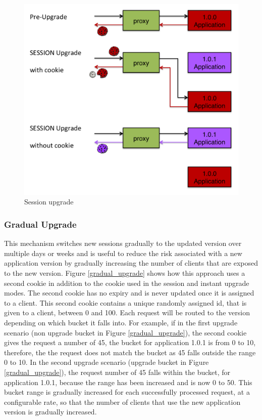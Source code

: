 \documentclass[a4paper,11pt,twoside]{report}
\begin{document}
   
\begin{figure}[!ht]
  \centering
     \includegraphics[scale=0.30]{session_upgrade}
  \caption{Session upgrade}
  \label{session_upgrade}
\end{figure}

\clearpage
\subsubsection*{Gradual Upgrade}
This mechanism switches new sessions gradually to the updated version over multiple days or weeks and is useful to reduce the risk associated with a new application version by gradually increasing the number of clients that are exposed to the new version. Figure \ref{gradual_upgrade} shows how this approach uses a second cookie in addition to the cookie used in the session and instant upgrade modes.  The second cookie has no expiry and is never updated once it is assigned to a client.  This second cookie contains a unique randomly assigned id, that is given to a client, between 0 and 100.  Each request will be routed to the version depending on which bucket it falls into. For example, if in the first upgrade scenario (non upgrade bucket in Figure \ref{gradual_upgrade}), the second cookie gives the request a number of 45, the bucket for application 1.0.1 is from 0 to 10, therefore, the the request does not match the bucket as 45 falls outside the range 0 to 10. In the second upgrade scenario (upgrade bucket in Figure \ref{gradual_upgrade}), the request number of 45 falls within the bucket, for application 1.0.1, because the range has been increased and is now 0 to 50.  This bucket range is gradually increased for each successfully processed request, at a configurable rate, so that the number of clients that use the new application version is gradually increased.     
   
\end{document}

